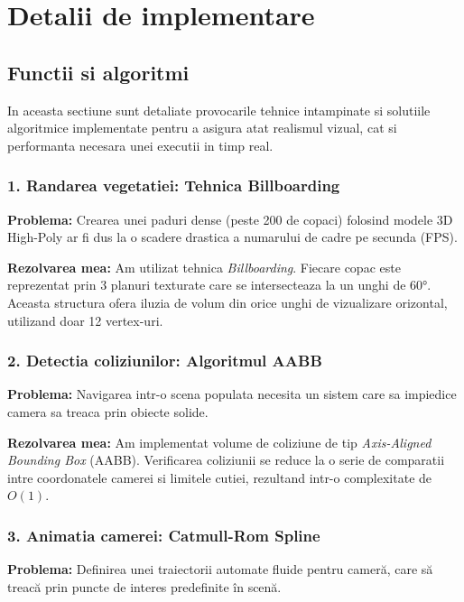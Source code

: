 \documentclass[11pt,a4paper]{article}
\begin{document}
\section{Detalii de implementare}

\subsection{Functii si algoritmi}
In aceasta sectiune sunt detaliate provocarile tehnice intampinate si solutiile algoritmice implementate pentru a asigura atat realismul vizual, cat si performanta necesara unei executii in timp real.

\subsubsection{1. Randarea vegetatiei: Tehnica Billboarding}
\textbf{Problema:} Crearea unei paduri dense (peste 200 de copaci) folosind modele 3D High-Poly ar fi dus la o scadere drastica a numarului de cadre pe secunda (FPS).

\textbf{Rezolvarea mea:} Am utilizat tehnica \textit{Billboarding}. Fiecare copac este reprezentat prin 3 planuri texturate care se intersecteaza la un unghi de 60°. Aceasta structura ofera iluzia de volum din orice unghi de vizualizare orizontal, utilizand doar 12 vertex-uri.

\subsubsection{2. Detectia coliziunilor: Algoritmul AABB}
\textbf{Problema:} Navigarea intr-o scena populata necesita un sistem care sa impiedice camera sa treaca prin obiecte solide.

\textbf{Rezolvarea mea:} Am implementat volume de coliziune de tip \textit{Axis-Aligned Bounding Box} (AABB). Verificarea coliziunii se reduce la o serie de comparatii intre coordonatele camerei si limitele cutiei, rezultand intr-o complexitate de $O(1)$.

\subsubsection{3. Animatia camerei: Catmull-Rom Spline}
\textbf{Problema:} Definirea unei traiectorii automate fluide pentru cameră, care să treacă prin puncte de interes predefinite în scenă.
\end{document}
